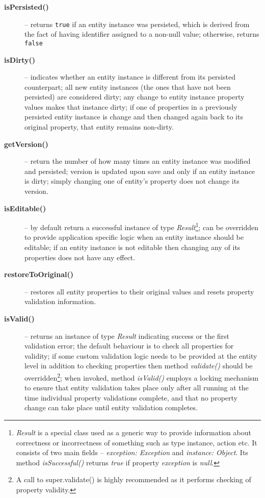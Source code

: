   \begin{description}
    \item[\textbf{isPersisted()}] -- returns \texttt{true} if an entity instance was persisted, which is derived from the fact of having identifier assigned to a non-null value; otherwise, returns \texttt{false}
    \item[\textbf{isDirty()}] -- indicates whether an entity instance is different from its persisted counterpart; all new entity instances (the ones that have not been persisted) are considered dirty; any change to entity instance property values makes that instance dirty; if one of properties in a previously persisted entity instance is change and then changed again back to its original property, that entity remains non-dirty.
    \item[\textbf{getVersion()}] -- return the number of how many times an entity instance was modified and persisted; version is updated upon save and only if an entity instance is dirty; simply changing one of entity's property does not change its version.
    \item[\textbf{isEditable()}] -- by default return a successful instance of type \emph{Result}\footnote{\emph{Result} is a special class used as a generic way to provide information about correctness or incorrectness of something such as type instance, action etc. It consists of two main fields -- \emph{exception: Exception} and \emph{instance: Object}. Its method \emph{isSuccessful()} returns \emph{true} if property \emph{exception} is \emph{null}.}; can be overridden to provide application specific logic when an entity instance should be editable; if an entity instance is not editable then changing any of its properties does not have any effect.
    \item[\textbf{restoreToOriginal()}] -- restores all entity properties to their original values and resets property validation information.
    \item[\textbf{isValid()}] -- returns an instance of type \emph{Result} indicating success or the first validation error; the default behaviour is to check all properties for validity; if some custom validation logic needs to be provided at the entity level in addition to checking properties then method \emph{validate()} should be overridden\footnote{A call to super.validate() is highly recommended as it performs checking of property validity.}; when invoked, method \emph{isValid()} employs a locking mechanism to ensure that entity validation takes place only after all running at the time individual property validations complete, and that no property change can take place until entity validation completes.
  \end{description}
  

